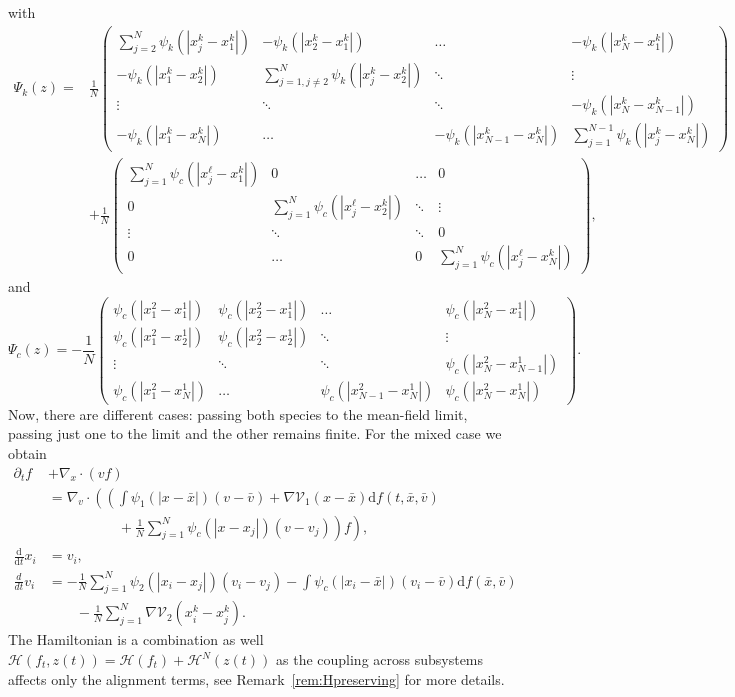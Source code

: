 \documentclass[11pt]{article}
\newcommand{\calH}[0]{\mathcal H}
\newcommand{\calV}[0]{\mathcal V}
\newcommand{\dd}[0]{\mathrm d}
\newcommand{\sumj}[0]{\sum_{j=1}^N}
\begin{document}
\begin{bibunit}[abbrv]
\begin{equation}
\end{equation}
with 
 \begin{align*}  \Psi_k(z) =& \frac{1}{N}\!\begin{pmatrix} \displaystyle\sum_{j=2}^N \!\psi_k(|x^k_j-x^k_1|) &-\psi_k(|x^k_2-x^k_1|) & \ldots & -\psi_k(|x^k_N-x^k_1|)\\
 -\psi_k(|x^k_1-x^k_2|) & \displaystyle\sum_{j=1,j\ne 2}^N \!\psi_k(|x^k_j-x^k_2|)& \ddots & \vdots\\
 \vdots &\ddots &\ddots&-\psi_k(|x^k_N\!-\!x^k_{N-1}|)\\
 -\psi_k(|x^k_1-x^k_N|)&\ldots&-\psi_k(|x^k_{N-1}\!-\!x^k_N|)&\displaystyle\sum_{j=1}^{N-1} \!\psi_k(|x^k_j-x^k_N|)\end{pmatrix}\\
 &+\frac{1}{N}\!\begin{pmatrix} \displaystyle\sumj \!\psi_c(|x^\ell_j-x^k_1|) &0 & \ldots & 0\\
 0 & \displaystyle\sumj \!\psi_c(|x^\ell_j-x^k_2|)& \ddots & \vdots\\
 \vdots &\ddots &\ddots&0\\
 0&\ldots&0&\displaystyle\sumj \!\psi_c(|x^\ell_j-x^k_N|)\end{pmatrix},
 \end{align*}
and 
\[  \Psi_c(z) =-\frac{1}{N}\!\begin{pmatrix} \psi_{c}(|x_1^2-x_1^1|) &\psi_{c}(|x_2^2-x_1^1|) & \ldots & \psi_{c}(|x_{N}^2-x_1^1|)\\
\psi_{c}(|x_1^2-x_2^1|) & \psi_{c}(|x_2^2-x_2^1|) & \ddots & \vdots\\
\vdots &\ddots &\ddots&\psi_{c}(|x_{N}^2\!-\!x_{N-1}^1|)\\
\psi_{c}(|x_1^2-x_{N}^1|)&\ldots&\psi_{c}(|x_{N-1}^2\!-\!x_{N}^1|)&\psi_{c}(|x_N^2-x_N^1|) \end{pmatrix}.\]
Now, there are different cases: passing both species to the mean-field limit, passing just one to the limit and the other remains finite.
For the mixed case we obtain
\begin{align*}
\partial_t f &+ \nabla_x \cdot \left( v f \right) \\
&= \nabla_v \cdot \left(\left( \int \psi_1(|x - \bar x|)( v-\bar v ) + \nabla \mathcal V_1(x - \bar x) \dd f(t,\bar x,\bar v) \right. \right. \\
& \qquad \qquad\quad + \left.\left. \frac{1}{N}\sum_{j=1}^N \psi_{c}(| x - x_j |)(v - v_j)  \right) f \right), \\
\frac{\dd}{\dd t} x_i &= v_i, \\
\frac{d}{dt} v_i &=  -\frac{1}{N} \sum_{j=1}^{N} \psi_2(| x_i - x_j |)(v_i - v_j) - \int  \psi_{c}(| x_i - \bar x |)(v_i - \bar v) \dd f(\bar x, \bar v)\\
    &\qquad - \frac{1}{N} \sum_{j=1}^{N} \nabla \calV_2(x_i^k - x_j^k).
\end{align*}
The Hamiltonian is a combination as well
$\calH(f_t,z(t)) = \calH(f_t) + \calH^N(z(t))$ as the coupling across subsystems affects only the alignment terms, see Remark~\ref{rem:Hpreserving} for more details.


\end{bibunit}
\end{document}
